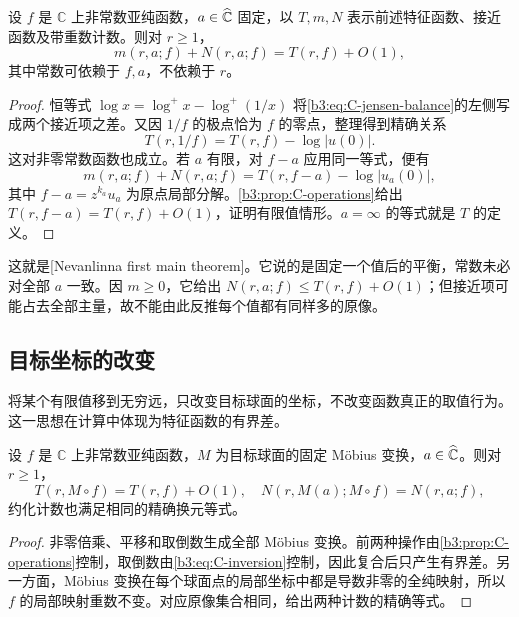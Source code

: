 \begin{theorem}[第一基本定理]\label{b3:thm:C-first-main}
设 \(f\) 是 \(\mathbb C\) 上非常数亚纯函数，\(a\in\widehat{\mathbb C\kern0pt}\) 固定，以 \(T,m,N\) 表示前述特征函数、接近函数及带重数计数。则对 \(r\ge1\)，
\begin{equation}\label{b3:eq:C-first-main}
 m(r,a;f)+N(r,a;f)=T(r,f)+O(1),
\end{equation}
其中常数可依赖于 \(f,a\)，不依赖于 \(r\)。
\end{theorem}
\begin{proof}
恒等式 \(\log x=\log^+x-\log^+(1/x)\) 将\eqref{b3:eq:C-jensen-balance}的左侧写成两个接近项之差。又因 \(1/f\) 的极点恰为 \(f\) 的零点，整理得到精确关系
\begin{equation}\label{b3:eq:C-inversion}
 T(r,1/f)=T(r,f)-\log|u(0)|.
\end{equation}
这对非零常数函数也成立。若 \(a\) 有限，对 \(f-a\) 应用同一等式，便有
\[
 m(r,a;f)+N(r,a;f)=T(r,f-a)-\log|u_a(0)|,
\]
其中 \(f-a=z^{k_a}u_a\) 为原点局部分解。\cref{b3:prop:C-operations}给出 \(T(r,f-a)=T(r,f)+O(1)\)，证明有限值情形。\(a=\infty\) 的等式就是 \(T\) 的定义。
\end{proof}

这就是[Nevanlinna first main theorem]。它说的是固定一个值后的平衡，常数未必对全部 \(a\) 一致。因 \(m\ge0\)，它给出 \(N(r,a;f)\le T(r,f)+O(1)\)；但接近项可能占去全部主量，故不能由此反推每个值都有同样多的原像。

\subsection{目标坐标的改变}
\label{b3:subsec:C0202}

将某个有限值移到无穷远，只改变目标球面的坐标，不改变函数真正的取值行为。这一思想在计算中体现为特征函数的有界差。

\begin{proposition}[Möbius 换元]\label{b3:prop:C-mobius}
设 \(f\) 是 \(\mathbb C\) 上非常数亚纯函数，\(M\) 为目标球面的固定 Möbius 变换，\(a\in\widehat{\mathbb C\kern0pt}\)。则对 \(r\ge1\)，
\[
 T(r,M\circ f)=T(r,f)+O(1),
 \quad N(r,M(a);M\circ f)=N(r,a;f),
\]
约化计数也满足相同的精确换元等式。
\end{proposition}
\begin{proof}
非零倍乘、平移和取倒数生成全部 Möbius 变换。前两种操作由\cref{b3:prop:C-operations}控制，取倒数由\eqref{b3:eq:C-inversion}控制，因此复合后只产生有界差。另一方面，Möbius 变换在每个球面点的局部坐标中都是导数非零的全纯映射，所以 \(f\) 的局部映射重数不变。对应原像集合相同，给出两种计数的精确等式。
\end{proof}

